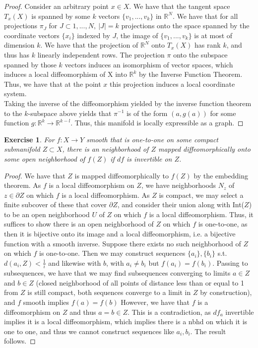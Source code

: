 \documentclass{article}
\newtheorem{exercise}{Exercise}
\begin{document}
        \begin{proof}
          Consider an arbitrary point $x \in X$. We have that the tangent space $T_{x}(X)$ is spanned by some $k$ vectors $\{v_{1},...,v_{k}\}$ in $\mathbb{R}^{N}$. We have that for all projections $\pi_{J}$ for $J \subset {1,...,N},\ |J| =k$ projections onto the space spanned by the coordinate vectors $\{x_{i}\}$ indexed by $J$, the image of $\{v_{1},...,v_{k}\}$ is at most of dimension $k$. We have that the projection of $\mathbb{R}^{N}$ onto $T_{x}(X)$ has rank $k$, and thus has $k$ linearly independent rows. The projection $\pi$ onto the subspace spanned by those $k$ vectors induces an isomorphism of vector spaces, which induces a local diffeomorphism of X into $\mathbb{R}^{k}$ by the Inverse Function Theorem. Thus, we have that at the point $x$ this projection induces a local coordinate system. \\
          Taking the inverse of the diffeomorphism yielded by the inverse function theorem to the $k$-subspace above yields that $\pi^{-1}$ is of the form $(a,g(a))$ for some function $g:\mathbb{R}^{k} \to \mathbb{R}^{k-l}$. Thus, this manifold is locally expressible as a graph. 
        \end{proof}

        \begin{exercise}
          For $f: X \to Y$ smooth that is one-to-one on some compact submanifold $Z \subset X$, there is an neighborhood of $Z$ mapped diffeomorphically onto some open neighborhood of $f(Z)$ if $df$ is invertible on $Z$. 
        \end{exercise}
        \begin{proof}
          We have that $Z$ is mapped diffeomorphically to $f(Z)$ by the embedding theorem. As $f$ is a local diffeomorphism on $Z$, we have neighborhoods $N_{z}$ of $ z \in \partial Z$ on which $f$ is a local diffeomorphism. As $Z$ is compact, we may select a finite subcover of these that cover $\partial Z$, and consider their union along with Int($Z$) to be an open neighborhood $U$ of $Z$ on which $f$ is a local diffeomorphism. Thus, it suffices to show there is an open neighborhood of $Z$ on which $f$ is one-to-one, as then it is bijective onto its image and a local diffeomorphism, i.e. a bijective function with a smooth inverse. Suppose there exists no such neighborhood of $Z$ on which $f$ is one-to-one. Then we may construct sequences $\{a_{i}\}, \{b_{i}\}$ s.t. $d(a_{i},Z) < \frac{1}{i}$ and likewise with $b$, with $a_{i} \neq b_{i}$ but $f(a_{i}) = f(b_{i})$. Passing to subsequences, we have that we may find subsequences converging to limits $a \in Z$ and $b \in Z$ (closed neighborhood of all points of distance less than or equal to 1 from $Z$ is still compact, both sequences converge to a limit in $Z$ by construction), and $f$ smooth implies $f(a) = f(b)$ However, we have that $f$ is a diffeomorphism on $Z$ and thus $a = b \in Z$. This is a contradiction, as $df_{a}$ invertible implies it is a local diffeomorphism, which implies there is a nbhd on which it is one to one, and thus we cannot construct sequences like $a_{i}, b_{i}$. The result follows.  
          \end{proof}
      
\end{document}
